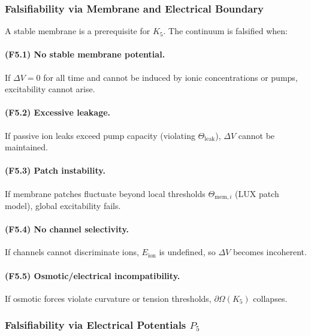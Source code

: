 \subsubsection{Falsifiability via Membrane and Electrical Boundary}

A stable membrane is a prerequisite for $K_5$.
The continuum is falsified when:

\paragraph{(F5.1) No stable membrane potential.}
If $\Delta V = 0$ for all time and cannot be induced by ionic
concentrations or pumps, excitability cannot arise.

\paragraph{(F5.2) Excessive leakage.}
If passive ion leaks exceed pump capacity (violating
$\Theta_{\mathrm{leak}}$), $\Delta V$ cannot be maintained.

\paragraph{(F5.3) Patch instability.}
If membrane patches fluctuate beyond local thresholds
$\Theta_{\mathrm{mem},i}$ (LUX patch model), global excitability fails.

\paragraph{(F5.4) No channel selectivity.}
If channels cannot discriminate ions, $E_{\mathrm{ion}}$ is undefined,
so $\Delta V$ becomes incoherent.

\paragraph{(F5.5) Osmotic/electrical incompatibility.}
If osmotic forces violate curvature or tension thresholds,
$\partial\Omega(K_5)$ collapses.



\subsubsection{Falsifiability via Electrical Potentials \texorpdfstring{$P_5$}{P_5}}

